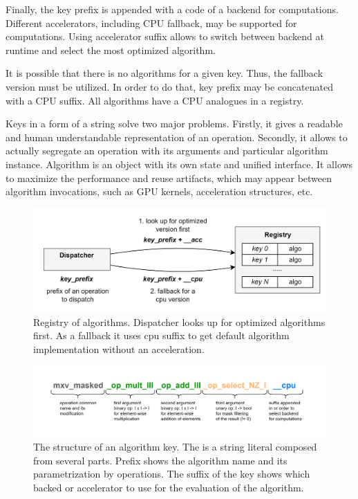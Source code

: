 Finally, the key prefix is appended with a code of a backend  for computations. Different accelerators, including CPU fallback, may be supported for computations. Using accelerator suffix allows to switch between backend at runtime and select the most optimized algorithm. 

It is possible that there is no algorithms for a given key. Thus, the fallback version must be utilized. In order to do that, key prefix may be concatenated with a CPU suffix. All algorithms have a CPU analogues in a registry.

Keys in a form of a string solve two major problems. Firstly, it gives a readable and human understandable representation of an operation. Secondly, it allows to actually segregate an operation with its arguments and particular algorithm instance. Algorithm is an object with its own state and unified interface. It allows to maximize the performance and reuse artifacts, which may appear between algorithm invocations, such as GPU kernels, acceleration structures, etc. 

\begin{figure}
    \centering
    \includegraphics[width=1.0\textwidth]{images/spla_algo_registry.png}
    \caption{Registry of algorithms. Dispatcher looks up for optimized algorithms first. As a fallback it uses cpu suffix to get default algorithm implementation without an acceleration.}
    \label{fig:algo_registry}
\end{figure}

\begin{figure}[]
    \centering
    \includegraphics[width=1.0\textwidth]{images/spla_algo_key.png}
    \caption{The structure of an algorithm key. The is a string literal composed from several parts. Prefix shows the algorithm name and its parametrization by operations. The suffix of the key shows which backed or accelerator to use for the evaluation of the algorithm.}
    \label{fig:algo_key}
\end{figure}

